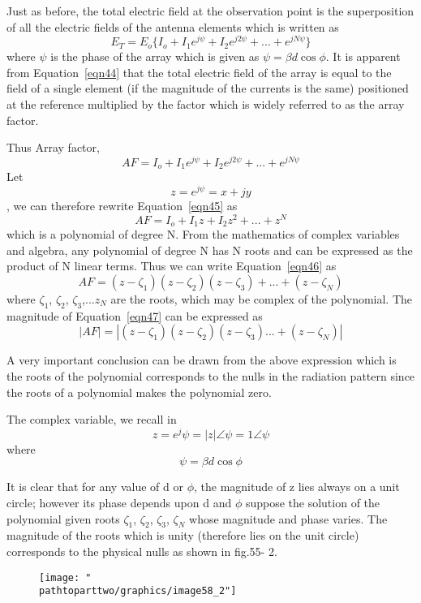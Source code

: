 Just as before, the total electric field at the observation point is the superposition of all the electric fields of the antenna elements which is written as 
\begin{equation}
E_{T}=E_{o}\{I_{o}+I_{1}e^{j\psi}+I_{2}e^{j2\psi}+...+e^{jN\psi}\}
\label{eqn44}
\end{equation}
where $\psi$ is the phase of the array which is given as $\psi=\beta d\cos\phi$. It is apparent from Equation~\ref{eqn44} that the total electric field of the array is equal to the field of a single element (if the magnitude of the currents is the same) positioned at the reference multiplied by the factor which is widely referred to as the array factor. 

Thus Array factor,
\begin{equation}
AF=I_{o}+I_{1}e^{j\psi}+I_{2}e^{j2\psi}+...+e^{jN\psi}
\label{eqn45}
\end{equation}
 Let $$z=e^{j\psi}=x+jy$$, we can therefore rewrite Equation~\ref{eqn45} as
\begin{equation}
AF=I_{o}+I_{1}z+I_{2}z^{2}+...+z^N
\label{eqn46}
\end{equation}
which is a polynomial of degree N. From the mathematics of complex variables and algebra, any polynomial of degree N has N roots and can be expressed as the product of N linear terms. Thus we can write Equation~\ref{eqn46} as 
\begin{equation}
AF=(z-\zeta_1)(z-\zeta_2)(z-\zeta_3)+...+(z-\zeta_N)
\label{eqn47}
\end{equation}
where $\zeta_{1}$, $\zeta_{2}$, $\zeta_{3}$,...$z_{N}$ are the roots, which may be complex of the polynomial. The magnitude of Equation~\ref{eqn47} can be expressed as
\begin{equation}
|AF|=|(z-\zeta_1)(z-\zeta_2)(z-\zeta_3)...+(z-\zeta_N)|
\label{eqn48}
\end{equation}

A very important conclusion can be drawn from the above expression which is the roots of the polynomial corresponds to the nulls in the radiation pattern since the roots of a polynomial makes the polynomial zero.

The complex variable, we recall in 
$$z=e^j{\psi}=|z|\angle\psi = 1\angle\psi$$
where $$\psi=\beta d\cos\phi$$

It is clear that for any value of d or $\phi$, the magnitude of z lies always on a unit circle; however its phase depends upon d and $\phi$ suppose the solution of the polynomial given roots $\zeta_{1}$, $\zeta_{2}$, $\zeta_{3}$, $\zeta_{N}$ whose magnitude and phase varies. The magnitude of the roots which is unity (therefore lies on the unit circle) corresponds to the physical nulls as shown in fig.55- 2.
\begin{figure}[h]
\centering
\texttt{[image: "\\pathtoparttwo/graphics/image58\_2"]}
\caption{}
\label{fig:fig 55_2}
\end{figure}

